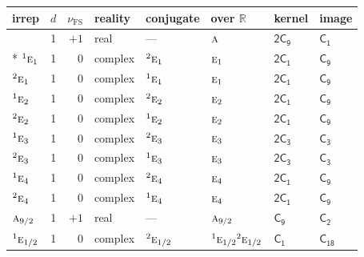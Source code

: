 \documentclass[10pt,a4paper]{article}
\makeatletter
\def\grouprule#1#2{\noalign{\marks\LTgroupmarks{\the\belowrulesep}\nobreak\vskip#1%
  \vskip\aboverulesep}\multispan\LT@cols\unskip{\leaders\hrule\@height#2\hfill\kern\z@}\cr
  \noalign{\penalty\LTrulebreak\vskip\belowrulesep\global\@lastruleclass\z@}}
\numberwithin{equation}{section}
\newcommand{\grp}[1]{\mathsf{#1}}
\newcommand{\irr}[1]{\text{\normalfont\scshape #1}}
\newcommand{\conjpair}[1]{{}^{#1}}
\newcommand{\detbox}[1]{{\setlength{\fboxsep}{1pt}\fbox{#1}}}
\newcommand{\fsind}{\nu_{\mathrm{FS}}}
\makeatother
\begin{document}
{\small\renewcommand{\arraystretch}{1.25}\setlength{\tabcolsep}{4pt}\begin{longtable}{@{}lrrlllll@{}}\toprule
irrep & $d$ & $\fsind$ & reality & conjugate & over $\mathbb{R}$ & kernel & image\\\midrule\endhead
\bottomrule\endfoot\endlastfoot
\detbox{$\irr{a}$} & 1 & $+1$ & real & --- & $\irr{a}$ & \href{2C9.pdf}{$\grp{2C_{9}}$} & \href{../../../rotation/data/pdf/C1.pdf}{$\grp{C_{1}}$}\\*
$\conjpair{1}\irr{e}_{1}$ & 1 & $0$ & complex & $\conjpair{2}\irr{e}_{1}$ & $\irr{e}_{1}$ & \href{2C1.pdf}{$\grp{2C_{1}}$} & \href{../../../rotation/data/pdf/C9.pdf}{$\grp{C_{9}}$}\\
$\conjpair{2}\irr{e}_{1}$ & 1 & $0$ & complex & $\conjpair{1}\irr{e}_{1}$ & $\irr{e}_{1}$ & \href{2C1.pdf}{$\grp{2C_{1}}$} & \href{../../../rotation/data/pdf/C9.pdf}{$\grp{C_{9}}$}\\
$\conjpair{1}\irr{e}_{2}$ & 1 & $0$ & complex & $\conjpair{2}\irr{e}_{2}$ & $\irr{e}_{2}$ & \href{2C1.pdf}{$\grp{2C_{1}}$} & \href{../../../rotation/data/pdf/C9.pdf}{$\grp{C_{9}}$}\\
$\conjpair{2}\irr{e}_{2}$ & 1 & $0$ & complex & $\conjpair{1}\irr{e}_{2}$ & $\irr{e}_{2}$ & \href{2C1.pdf}{$\grp{2C_{1}}$} & \href{../../../rotation/data/pdf/C9.pdf}{$\grp{C_{9}}$}\\
$\conjpair{1}\irr{e}_{3}$ & 1 & $0$ & complex & $\conjpair{2}\irr{e}_{3}$ & $\irr{e}_{3}$ & \href{2C3.pdf}{$\grp{2C_{3}}$} & \href{../../../rotation/data/pdf/C3.pdf}{$\grp{C_{3}}$}\\
$\conjpair{2}\irr{e}_{3}$ & 1 & $0$ & complex & $\conjpair{1}\irr{e}_{3}$ & $\irr{e}_{3}$ & \href{2C3.pdf}{$\grp{2C_{3}}$} & \href{../../../rotation/data/pdf/C3.pdf}{$\grp{C_{3}}$}\\
$\conjpair{1}\irr{e}_{4}$ & 1 & $0$ & complex & $\conjpair{2}\irr{e}_{4}$ & $\irr{e}_{4}$ & \href{2C1.pdf}{$\grp{2C_{1}}$} & \href{../../../rotation/data/pdf/C9.pdf}{$\grp{C_{9}}$}\\
$\conjpair{2}\irr{e}_{4}$ & 1 & $0$ & complex & $\conjpair{1}\irr{e}_{4}$ & $\irr{e}_{4}$ & \href{2C1.pdf}{$\grp{2C_{1}}$} & \href{../../../rotation/data/pdf/C9.pdf}{$\grp{C_{9}}$}\\
\grouprule{0pt}{\lightrulewidth}
$\irr{a}_{9/2}$ & 1 & $+1$ & real & --- & $\irr{a}_{9/2}$ & \href{C9.pdf}{$\grp{C_{9}}$} & \href{../../../rotation/data/pdf/C2.pdf}{$\grp{C_{2}}$}\\
$\conjpair{1}\irr{e}_{1/2}$ & 1 & $0$ & complex & $\conjpair{2}\irr{e}_{1/2}$ & $\conjpair{1}\irr{e}_{1/2}\conjpair{2}\irr{e}_{1/2}$ & \href{C1.pdf}{$\grp{C_{1}}$} & $\grp{C_{18}}$\\

\end{longtable}}
\end{document}
